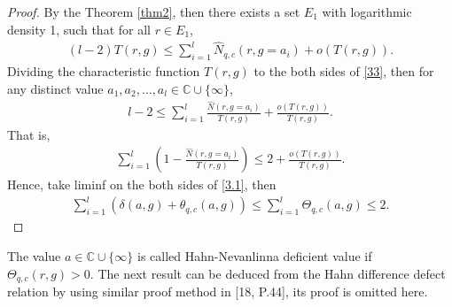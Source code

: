 \documentclass[sn-mathphys-num]{sn-jnl}%
\theoremstyle{thmstyleone}%
\theoremstyle{thmstyletwo}%
\theoremstyle{thmstylethree}%
\begin{document}
\begin{proof}
	By the Theorem \ref{thm2}, then there exists a set \(E_{1}\) with logarithmic density 1, such that for all \(r\in E_{1}\),
	\begin{align}\label{33}
		(l-2)T(r,g)\leq\sum_{i=1}^{l}\hat{N}_{q,c}(r,g=a_{i})+o(T(r,g)).
	\end{align}
	\indent Dividing the characteristic function $T(r,g)$ to the both sides of \eqref{33}, then for any distinct value $a_{1},a_{2},\ldots,a_{l}\in\mathbb{C}\cup\{\infty\}$,
	\begin{align*}
		l-2\leq\sum_{i=1}^{l}\frac{\hat{N}(r,g=a_{i})}{T(r,g)}+\frac{o(T(r,g))}{T(r,g)}.
	\end{align*}
	That is,
	\begin{align}\label{3.1}
		\sum_{i=1}^{l}\left(1-\frac{\hat{N}(r,g=a_{i})}{T(r,g)}\right)\leq 2+\frac{o(T(r,g))}{T(r,g)}.
	\end{align}
	Hence, take liminf on the both sides of \eqref{3.1}, then
	\begin{align*}
		\sum_{i=1}^{l}(\delta(a,g)+\theta_{q,c}(a,g))\leq\sum_{i=1}^{l}\Theta_{q,c}(a,g)\leq2.
	\end{align*}
\end{proof}		
The value $a\in\mathbb{C}\cup\{\infty\}$ is called Hahn-Nevanlinna deficient value if $\Theta_{q,c}(r,g)>0$. The next result can be deduced from the Hahn difference defect relation by using similar proof method in [18, P.44], its proof is omitted here. \\
\end{document}
